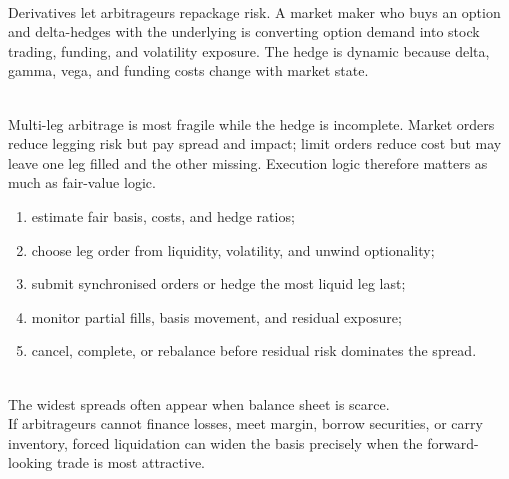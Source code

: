 \documentclass[a4paper,oneside,openany]{book}
\begin{document}
\begin{mechanism} \\
Derivatives let arbitrageurs repackage risk. A market maker who buys an option and delta-hedges with the underlying is converting option demand into stock trading, funding, and volatility exposure. The hedge is dynamic because delta, gamma, vega, and funding costs change with market state.
\end{mechanism}

\begin{caveat} \\
Multi-leg arbitrage is most fragile while the hedge is incomplete. Market orders reduce legging risk but pay spread and impact; limit orders reduce cost but may leave one leg filled and the other missing. Execution logic therefore matters as much as fair-value logic.
\end{caveat}

\begin{process} 
\begin{enumerate}[label=\roman*.]
\setlength{\itemsep}{0pt}
\item estimate fair basis, costs, and hedge ratios;
\item choose leg order from liquidity, volatility, and unwind optionality;
\item submit synchronised orders or hedge the most liquid leg last;
\item monitor partial fills, basis movement, and residual exposure;
\item cancel, complete, or rebalance before residual risk dominates the spread.
\end{enumerate}
\end{process}

\begin{caveat} \\
The widest spreads often appear when balance sheet is scarce.\\
If arbitrageurs cannot finance losses, meet margin, borrow securities, or carry inventory, forced liquidation can widen the basis precisely when the forward-looking trade is most attractive.
\end{caveat}
\end{document}
